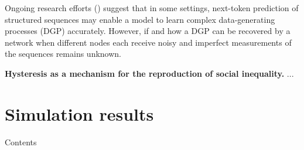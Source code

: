 \documentclass[]{article}
\begin{document}
Ongoing research efforts (\cite{malachAutoRegressiveNextTokenPredictors2023}) suggest that in some settings, next-token prediction of structured sequences may enable a model to learn complex data-generating processes (DGP) accurately. However, if and how a DGP can be recovered by a network when different nodes each receive noisy and imperfect measurements of the sequences remains unknown.

\textbf{Hysteresis as a mechanism for the reproduction of social inequality.} ...

\printbibliography[heading=bibintoc, title={References}]



\appendix

\section{Simulation results}

Contents
\end{document}
